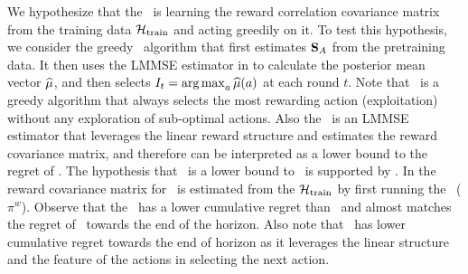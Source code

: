We hypothesize that the \pred\ is learning the reward correlation covariance matrix from the training data $\mathcal{H}_{\text{train}}$ and acting greedily on it. To test this hypothesis, we consider the greedy \bayes\ algorithm that first estimates $\mathbf{S}_A$ from the pretraining data. It then uses the LMMSE estimator in  to calculate the posterior mean vector $\widehat{\mu}$, and then selects $I_{t} =\mathop{\rm arg\,max}_a \widehat{\mu}(a)$ at each round $t$. Note that \bayes\ is a greedy algorithm that always selects the most rewarding action (exploitation) without any exploration of sub-optimal actions. 
%
Also the \bayes\ is an LMMSE estimator that leverages the linear reward structure and estimates the reward covariance matrix, and therefore can be interpreted as a lower bound to the regret of \pred.
%
The hypothesis that \bayes\ is a lower bound to \pred\ is supported by .  In  the reward covariance matrix for \bayes\ is estimated from the $\mathcal{H}_{\text{train}}$ by first running the \ts\ ($\pi^w$). Observe that the \bayes\ has a lower cumulative regret than \pred\ and almost matches the regret of \pred\ towards the end of the horizon. 
%
Also note that \linucb\ has lower cumulative regret towards the end of horizon as it leverages the linear structure and the feature of the actions in selecting the next action.
%
%


%
%
%

    
